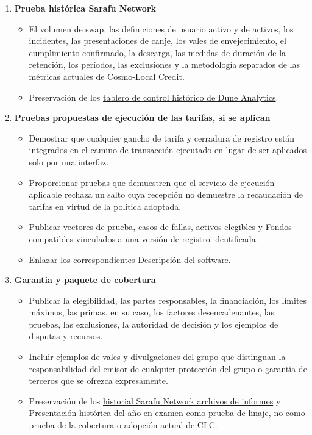 \documentclass[11pt]{article}
\begin{document}
\begin{enumerate}[leftmargin=*]
\item \textbf{Prueba histórica Sarafu Network}
\begin{itemize}[leftmargin=*]
\item El volumen de swap, las definiciones de usuario activo y de activos, los incidentes, las presentaciones de canje, los vales de envejecimiento, el cumplimiento confirmado, la descarga, las medidas de duración de la retención, los períodos, las exclusiones y la metodología separados de las métricas actuales de Cosmo-Local Credit.
\item Preservación de los \href{https://dune.com/grassrootseconomics/sarafu-network}{tablero de control histórico de Dune Analytics}.
\end{itemize}
\item \textbf{Pruebas propuestas de ejecución de las tarifas, si se aplican}
\begin{itemize}[leftmargin=*]
\item Demostrar que cualquier gancho de tarifa y cerradura de registro están integrados en el camino de transacción ejecutado en lugar de ser aplicados solo por una interfaz.
\item Proporcionar pruebas que demuestren que el servicio de ejecución aplicable rechaza un salto cuya recepción no demuestre la recaudación de tarifas en virtud de la política adoptada.
\item Publicar vectores de prueba, casos de fallas, activos elegibles y Fondos compatibles vinculados a una versión de registro identificada.
\item Enlazar los correspondientes \href{https://software.grassecon.org}{Descripción del software}.
\end{itemize}
\item \textbf{Garantia y paquete de cobertura}
\begin{itemize}[leftmargin=*]
\item Publicar la elegibilidad, las partes responsables, la financiación, los límites máximos, las primas, en su caso, los factores desencadenantes, las pruebas, las exclusiones, la autoridad de decisión y los ejemplos de disputas y recursos.
\item Incluir ejemplos de vales y divulgaciones del grupo que distinguan la responsabilidad del emisor de cualquier protección del grupo o garantía de terceros que se ofrezca expresamente.
\item Preservación de los \href{https://sarafu.network/reports}{historial Sarafu Network archivos de informes} y \href{https://youtu.be/5yGaP31bvs0?si=fZ-AMTEXsmVR8Ulv}{Presentación histórica del año en examen} como prueba de linaje, no como prueba de la cobertura o adopción actual de CLC.

\end{itemize}
\end{enumerate}
\end{document}
